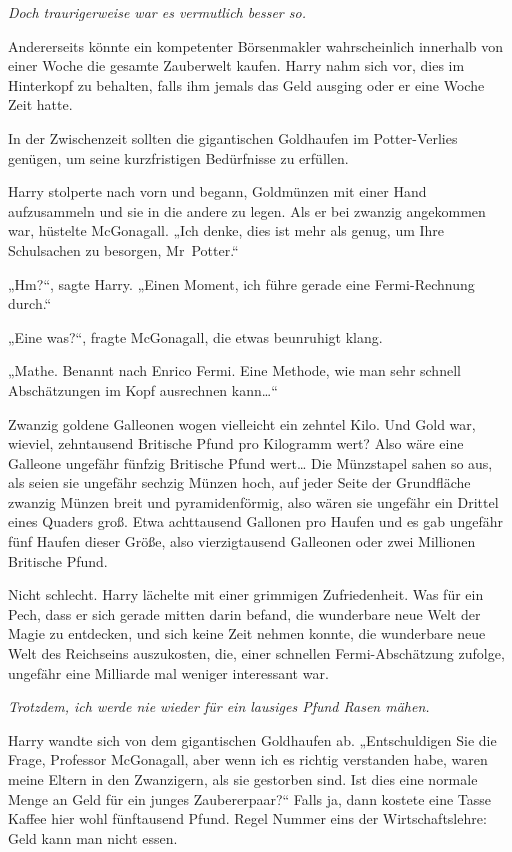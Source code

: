 \emph{Doch traurigerweise war es vermutlich besser so.}

Andererseits könnte ein kompetenter Börsenmakler wahrscheinlich innerhalb von einer Woche die gesamte Zauberwelt kaufen. Harry nahm sich vor, dies im Hinterkopf zu behalten, falls ihm jemals das Geld ausging oder er eine Woche Zeit hatte.

In der Zwischenzeit sollten die gigantischen Goldhaufen im Potter-Verlies genügen, um seine kurzfristigen Bedürfnisse zu erfüllen.

Harry stolperte nach vorn und begann, Goldmünzen mit einer Hand aufzusammeln und sie in die andere zu legen. Als er bei zwanzig angekommen war, hüstelte McGonagall. „Ich denke, dies ist mehr als genug, um Ihre Schulsachen zu besorgen, Mr~Potter.“

„Hm?“, sagte Harry. „Einen Moment, ich führe gerade eine Fermi-Rechnung durch.“

„Eine was?“, fragte McGonagall, die etwas beunruhigt klang. 

„Mathe. Benannt nach Enrico Fermi. Eine Methode, wie man sehr schnell Abschätzungen im Kopf ausrechnen kann…“

Zwanzig goldene Galleonen wogen vielleicht ein zehntel Kilo. Und Gold war, wieviel, zehntausend Britische Pfund pro Kilogramm wert? Also wäre eine Galleone ungefähr fünfzig Britische Pfund wert… Die Münzstapel sahen so aus, als seien sie ungefähr sechzig Münzen hoch, auf jeder Seite der Grundfläche zwanzig Münzen breit und pyramidenförmig, also wären sie ungefähr ein Drittel eines Quaders groß. Etwa achttausend Gallonen pro Haufen und es gab ungefähr fünf Haufen dieser Größe, also vierzigtausend Galleonen oder zwei Millionen Britische Pfund.

Nicht schlecht. Harry lächelte mit einer grimmigen Zufriedenheit. Was für ein Pech, dass er sich gerade mitten darin befand, die wunderbare neue Welt der Magie zu entdecken, und sich keine Zeit nehmen konnte, die wunderbare neue Welt des Reichseins auszukosten, die, einer schnellen Fermi-Abschätzung zufolge, ungefähr eine Milliarde mal weniger interessant war.

\emph{Trotzdem, ich werde nie wieder für ein lausiges Pfund Rasen mähen.}

Harry wandte sich von dem gigantischen Goldhaufen ab. „Entschuldigen Sie die Frage, Professor McGonagall, aber wenn ich es richtig verstanden habe, waren meine Eltern in den Zwanzigern, als sie gestorben sind. Ist dies eine normale Menge an Geld für ein junges Zaubererpaar?“ Falls ja, dann kostete eine Tasse Kaffee hier wohl fünftausend Pfund. Regel Nummer eins der Wirtschaftslehre: Geld kann man nicht essen.

